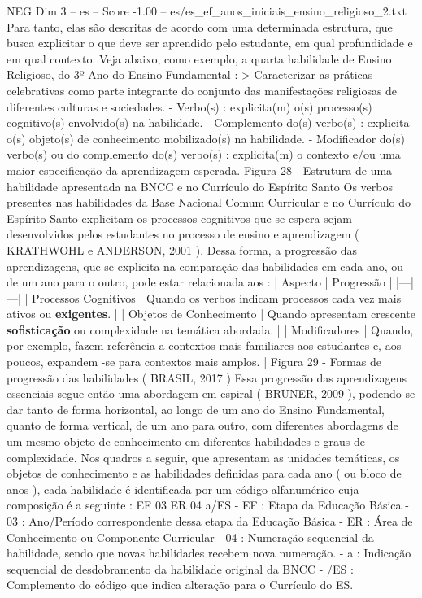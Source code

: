 \begin{textsample}{NEG Dim 3 – es – Score -1.00 – es/es\_ef\_anos\_iniciais\_ensino\_religioso\_2.txt}
Para tanto, elas são descritas de acordo com uma determinada estrutura, que busca explicitar o que deve ser aprendido pelo estudante, em qual profundidade e em qual contexto.
Veja abaixo, como exemplo, a quarta habilidade de Ensino Religioso, do 3º Ano do Ensino Fundamental : > Caracterizar as práticas celebrativas como parte integrante do conjunto das manifestações religiosas de diferentes culturas e sociedades. - Verbo(s) : explicita(m) o(s) processo(s) cognitivo(s) envolvido(s) na habilidade. - Complemento do(s) verbo(s) : explicita o(s) objeto(s) de conhecimento mobilizado(s) na habilidade. - Modificador do(s) verbo(s) ou do complemento do(s) verbo(s) : explicita(m) o contexto e/ou uma maior especificação da aprendizagem esperada.
Figura 28 - Estrutura de uma habilidade apresentada na BNCC e no Currículo do Espírito Santo Os verbos presentes nas habilidades da Base Nacional Comum Curricular e no Currículo do Espírito Santo explicitam os processos cognitivos que se espera sejam desenvolvidos pelos estudantes no processo de ensino e aprendizagem ( KRATHWOHL e ANDERSON, 2001 ).
Dessa forma, a progressão das aprendizagens, que se explicita na comparação das habilidades em cada ano, ou de um ano para o outro, pode estar relacionada aos : | Aspecto | Progressão | |---|---| | Processos Cognitivos | Quando os verbos indicam processos cada vez mais ativos ou \textbf{exigentes}. | | Objetos de Conhecimento | Quando apresentam crescente \textbf{sofisticação} ou complexidade na temática abordada. | | Modificadores | Quando, por exemplo, fazem referência a contextos mais familiares aos estudantes e, aos poucos, expandem -se para contextos mais amplos. | Figura 29 - Formas de progressão das habilidades ( BRASIL, 2017 ) Essa progressão das aprendizagens essenciais segue então uma abordagem em espiral ( BRUNER, 2009 ), podendo se dar tanto de forma horizontal, ao longo de um ano do Ensino Fundamental, quanto de forma vertical, de um ano para outro, com diferentes abordagens de um mesmo objeto de conhecimento em diferentes habilidades e graus de complexidade.
Nos quadros a seguir, que apresentam as unidades temáticas, os objetos de conhecimento e as habilidades definidas para cada ano ( ou bloco de anos ), cada habilidade é identificada por um código alfanumérico cuja composição é a seguinte : EF 03 ER 04 a/ES - EF : Etapa da Educação Básica - 03 : Ano/Período correspondente dessa etapa da Educação Básica - ER : Área de Conhecimento ou Componente Curricular - 04 : Numeração sequencial da habilidade, sendo que novas habilidades recebem nova numeração. - a : Indicação sequencial de desdobramento da habilidade original da BNCC - /ES : Complemento do código que indica alteração para o Currículo do ES.

\end{textsample}
